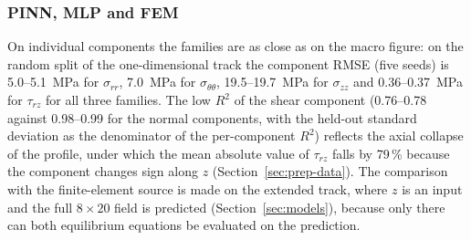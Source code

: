 \subsubsection{PINN, MLP and FEM}
\label{sec:res_fem}

On individual components the families are as close as on the macro figure: on the random split of the one-dimensional track the component RMSE (five seeds) is 5.0--5.1~MPa for $\sigma_{rr}$, 7.0~MPa for $\sigma_{\theta\theta}$, 19.5--19.7~MPa for $\sigma_{zz}$ and 0.36--0.37~MPa for $\tau_{rz}$ for all three families. The low $R^2$ of the shear component (0.76--0.78 against 0.98--0.99 for the normal components, with the held-out standard deviation as the denominator of the per-component $R^2$) reflects %
the axial collapse of the profile, under which the mean absolute value of $\tau_{rz}$ falls by 79\,\% because the component changes sign along $z$ (Section~\ref{sec:prep-data}). The comparison with the finite-element source is made on the extended track, where $z$ is an input and the full $8\times20$ field is predicted (Section~\ref{sec:models}), because only there can both equilibrium equations be evaluated on the prediction.

